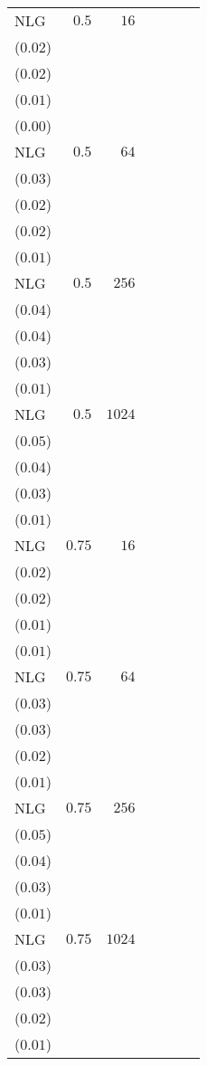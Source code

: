 \begin{table}[t]
\begin{tabular}{lrrrrrr}
NLG & \(0.5\) & \(16\) & \longcell{\(0.22\)\\{\tiny(\(0.02\))}} & \longcell{\(0.19\)\\{\tiny(\(0.02\))}} & \longcell{\(0.15\)\\{\tiny(\(0.01\))}} & \longcell{\(0.07\)\\{\tiny(\(0.00\))}} \\[2.2ex]
NLG & \(0.5\) & \(64\) & \longcell{\(0.42\)\\{\tiny(\(0.03\))}} & \longcell{\(0.37\)\\{\tiny(\(0.02\))}} & \longcell{\(0.27\)\\{\tiny(\(0.02\))}} & \longcell{\(0.11\)\\{\tiny(\(0.01\))}} \\[2.2ex]
NLG & \(0.5\) & \(256\) & \longcell{\(0.61\)\\{\tiny(\(0.04\))}} & \longcell{\(0.54\)\\{\tiny(\(0.04\))}} & \longcell{\(0.39\)\\{\tiny(\(0.03\))}} & \longcell{\(0.16\)\\{\tiny(\(0.01\))}} \\[2.2ex]
NLG & \(0.5\) & \(1024\) & \longcell{\(0.69\)\\{\tiny(\(0.05\))}} & \longcell{\(0.62\)\\{\tiny(\(0.04\))}} & \longcell{\(0.46\)\\{\tiny(\(0.03\))}} & \longcell{\(0.18\)\\{\tiny(\(0.01\))}} \\[2.2ex]
NLG & \(0.75\) & \(16\) & \longcell{\(0.14\)\\{\tiny(\(0.02\))}} & \longcell{\(0.13\)\\{\tiny(\(0.02\))}} & \longcell{\(0.11\)\\{\tiny(\(0.01\))}} & \longcell{\(0.06\)\\{\tiny(\(0.01\))}} \\[2.2ex]
NLG & \(0.75\) & \(64\) & \longcell{\(0.33\)\\{\tiny(\(0.03\))}} & \longcell{\(0.30\)\\{\tiny(\(0.03\))}} & \longcell{\(0.23\)\\{\tiny(\(0.02\))}} & \longcell{\(0.11\)\\{\tiny(\(0.01\))}} \\[2.2ex]
NLG & \(0.75\) & \(256\) & \longcell{\(0.51\)\\{\tiny(\(0.05\))}} & \longcell{\(0.46\)\\{\tiny(\(0.04\))}} & \longcell{\(0.34\)\\{\tiny(\(0.03\))}} & \longcell{\(0.15\)\\{\tiny(\(0.01\))}} \\[2.2ex]
NLG & \(0.75\) & \(1024\) & \longcell{\(0.64\)\\{\tiny(\(0.03\))}} & \longcell{\(0.58\)\\{\tiny(\(0.03\))}} & \longcell{\(0.43\)\\{\tiny(\(0.02\))}} & \longcell{\(0.18\)\\{\tiny(\(0.01\))}} \\[2.2ex]
\bottomrule
\end{tabular}
\end{table}
